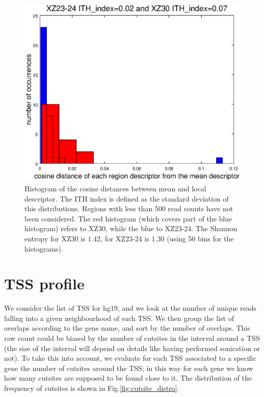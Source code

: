 \documentclass[11pt,a4paper]{article}
\begin{document}
\begin{figure}
\centering
\includegraphics[scale=0.5]{histo_xz2324VSxz30.eps}
\caption{Histogram of the cosine distances between mean and local descriptor. The ITH index is defined as the standard deviation of this distributions. Regions with less than 500 read counts have not been considered. The red histogram (which covers part of the blue histogram) refers to XZ30, while the blue to XZ23-24. The Shannon entropy for XZ30 is $1.42$, for XZ23-24 is $1.30$ (using 50 bins for the histograms).}
\label{fig:histo_xz30}
\end{figure}

\section{TSS profile}
We consider the list of TSS for hg19, and we look at the number of unique reads 
falling into a given neighbourhood of each TSS. We then group the list of 
overlaps according to the gene name, and sort by the number of overlaps. This raw count could be biased by the number of cutsites in the interval 
around a TSS (the size of the interval will depend on details like having performed sonication or not). To take this into account, we evaluate for each TSS associated to a specific gene the number of cutsites around the TSS; in this way 
for each gene we know how many cutsites are supposed to be found close to it. The distribution of the frequency of cutsites is shown in Fig.\ref{fig:cutsite_distro}.
\end{document}
